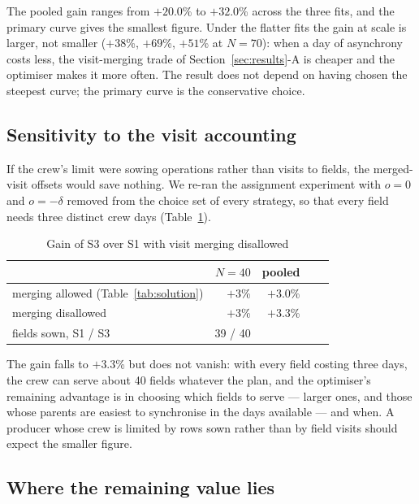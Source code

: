 \documentclass[10pt,twocolumn]{article}
\begin{document}
The pooled gain ranges from $+20.0$\% to $+32.0$\%
across the three fits, and the primary curve gives the
smallest figure. Under the flatter fits the gain at scale is larger,
not smaller ($+38$\%, $+69$\%, $+51$\%
at $N = 70$): when a day of asynchrony costs less, the
visit-merging trade of Section~\ref{sec:results}-A is cheaper and the
optimiser makes it more often. The result does not depend on having
chosen the steepest curve; the primary curve is the conservative
choice.

\subsection{Sensitivity to the visit accounting}

If the crew's limit were sowing operations rather than visits to
fields, the merged-visit offsets would save nothing. We re-ran the
assignment experiment with $o = 0$ and $o = -\delta$ removed from
the choice set of every strategy, so that every field needs three
distinct crew days (Table~\ref{tab:nomerge}).

\begin{table}[t]
\centering
\caption{Gain of S3 over S1 with visit merging disallowed}
\label{tab:nomerge}
\footnotesize
\begin{tabular}{lrrrr}
\hline
 & $N=40$ & pooled \\
\hline
merging allowed (Table~\ref{tab:solution}) & $+3$\% & $+3.0$\% \\
merging disallowed & $+3$\% & $+3.3$\% \\
fields sown, S1 / S3 & 39 / 40 & \\
\hline
\end{tabular}
\end{table}

The gain falls to $+3.3$\% but does not vanish: with
every field costing three days, the crew can serve about 40
fields whatever the plan, and the optimiser's remaining advantage
is in choosing which fields to serve --- larger ones, and those
whose parents are easiest to synchronise in the days available ---
and when. A producer whose crew is limited by rows sown rather than
by field visits should expect the smaller figure.

\subsection{Where the remaining value lies}
\end{document}
